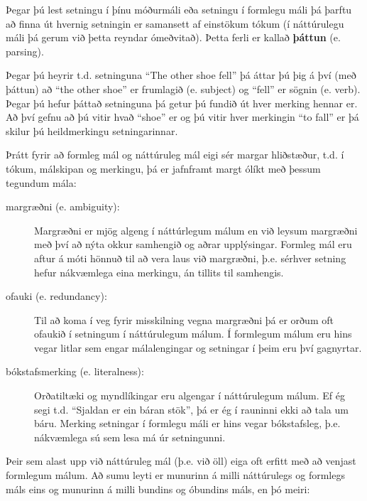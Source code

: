 Þegar þú lest setningu í þínu móðurmáli eða setningu í formlegu máli þá þarftu að finna út hvernig setningin er samansett af einstökum tókum (í náttúrulegu máli þá gerum við þetta reyndar ómeðvitað). 
Þetta ferli er kallað {\bf þáttun} (e. parsing).


Þegar þú heyrir t.d. setninguna ``The other shoe fell'' þá áttar þú þig á því (með þáttun) að ``the other shoe'' er frumlagið (e. subject) og ``fell'' er sögnin (e. verb).
Þegar þú hefur þáttað setninguna þá getur þú fundið út hver merking hennar er.
Að því gefnu að þú vitir hvað ``shoe'' er og þú vitir hver merkingin ``to fall'' er þá skilur þú heildmerkingu setningarinnar.

Þrátt fyrir að formleg mál og náttúruleg mál eigi sér margar hliðstæður, t.d. í tókum, málskipan og merkingu, þá er jafnframt margt ólíkt með þessum tegundum mála:


\begin{description}

\item[margræðni (e. ambiguity):] Margræðni er mjög algeng í náttúrlegum málum en við leysum margræðni með því að nýta okkur samhengið og aðrar upplýsingar.
Formleg mál eru aftur á móti hönnuð til að vera laus við margræðni, þ.e. sérhver setning hefur nákvæmlega eina merkingu, án tillits til samhengis.

\item[ofauki (e. redundancy):] Til að koma í veg fyrir misskilning vegna margræðni þá er orðum oft ofaukið í setningum í náttúrulegum málum.
Í formlegum málum eru hins vegar litlar sem engar málalengingar og setningar í þeim eru því gagnyrtar.

\item[bókstafsmerking (e. literalness):] Orðatiltæki og myndlíkingar eru algengar í náttúrulegum málum.
Ef ég segi t.d. ``Sjaldan er ein báran stök'', þá er ég í rauninni ekki að tala um báru.  
Merking setningar í formlegu máli er hins vegar bókstafsleg, þ.e. nákvæmlega sú sem lesa má úr setningunni. 

\end{description}

Þeir sem alast upp við náttúruleg mál (þ.e. við öll) eiga oft erfitt með að venjast formlegum málum.
Að sumu leyti er munurinn á milli náttúrulegs og formlegs máls eins og munurinn á milli bundins og óbundins máls, en þó meiri:

